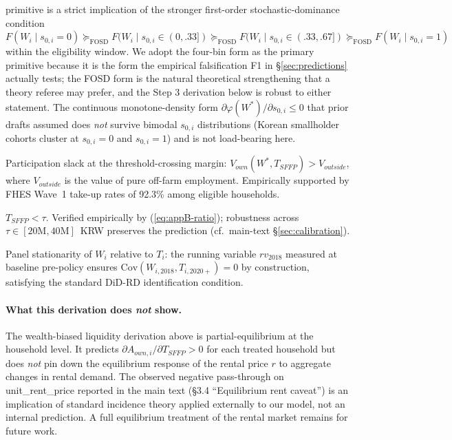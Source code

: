 \documentclass[11pt, a4paper]{article}
\begin{document}
\begin{description}
{  primitive is a strict implication of the stronger first-order
  stochastic-dominance condition
  $F(W_i \mid s_{0,i} = 0) \succeq_{\text{FOSD}} F(W_i \mid s_{0,i} \in (0, .33])
   \succeq_{\text{FOSD}} F(W_i \mid s_{0,i} \in (.33, .67])
   \succeq_{\text{FOSD}} F(W_i \mid s_{0,i} = 1)$
  within the eligibility window. We adopt the four-bin form as the
  primary primitive because it is the form the empirical falsification F1
  in \S\ref{sec:predictions} actually tests; the FOSD form is the natural
  theoretical strengthening that a theory referee may prefer, and the
  Step 3 derivation below is robust to either statement. The continuous
  monotone-density form $\partial \varphi(W^*)/\partial s_{0,i} \le 0$ that
  prior drafts assumed does \emph{not} survive bimodal $s_{0,i}$
  distributions (Korean smallholder cohorts cluster at $s_{0,i} = 0$ and
  $s_{0,i} = 1$) and is not load-bearing here.}
\item[(SC3) --- \textsc{interior-solution}.] Participation slack at the
  threshold-crossing margin: $V_{own}(W^*, T_{SFFP}) > V_{outside}$, where
  $V_{outside}$ is the value of pure off-farm employment. Empirically supported
  by FHES Wave~1 take-up rates of 92.3\% among eligible households.
\item[(SC4) --- \textsc{sufficient-for-sign} (Step 4 capital sub-prediction).]
  $T_{SFFP} < \tau$. Verified empirically by (\ref{eq:appB-ratio}); robustness
  across $\tau \in [20\text{M}, 40\text{M}]$~KRW preserves the prediction (cf.\
  main-text \S\ref{sec:calibration}).
\item[(SC5) --- \textsc{identification}.] Panel stationarity of $W_i$ relative
  to $T_i$: the running variable $rv_{2018}$ measured at baseline pre-policy
  ensures $\text{Cov}(W_{i,2018}, T_{i,2020+}) = 0$ by construction, satisfying
  the standard DiD-RD identification condition.
\end{description}

\paragraph{What this derivation does \emph{not} show.} The wealth-biased
liquidity derivation above is partial-equilibrium at the household level. It
predicts $\partial A_{own,i}/\partial T_{SFFP} > 0$ for each treated household but
does \emph{not} pin down the equilibrium response of the rental price $r$ to
aggregate changes in rental demand. The observed negative pass-through on
unit\_rent\_price reported in the main text (\S 3.4 ``Equilibrium rent
caveat'') is an implication of standard incidence theory
\citep{Floyd1965_incidence, AlstonJames2002_incidence} applied externally to
our model, not an internal prediction. A full equilibrium treatment of the
rental market remains for future work.
\end{document}

